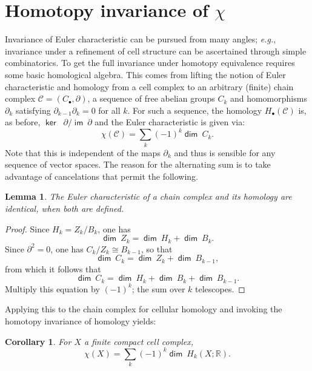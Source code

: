 \documentclass{psapm-l}
\newtheorem{lemma}[theorem]{Lemma}
\newtheorem{corollary}[theorem]{Corollary}
\theoremstyle{definition}
\theoremstyle{remark}
\numberwithin{equation}{section}
\begin{document}
\section{Homotopy invariance of $\chi$}
\label{sec:homot}

Invariance of Euler characteristic can be pursued from many angles; {{\em e.g.}}, invariance under a refinement of cell structure can be ascertained through simple combinatorics. To get the full invariance under homotopy equivalence requires some basic homological algebra. This comes from lifting the notion of Euler characteristic and homology from a cell complex to an arbitrary (finite) chain complex ${{\mathcal C}}=(C_{\bullet},{\partial})$, a sequence of free abelian groups $C_k$ and homomorphisms ${\partial}_k$ satisfying ${\partial}_{k-1}{\partial}_k=0$ for all $k$. For such a sequence, the homology $H_{\bullet}({{\mathcal C}})$ is, as before, ${{{\operatorname{\mathsf{{ker\ }}}}}}\ {\partial} / {{{\operatorname{\mathsf{{im}}}}}}\ {\partial}$ and the Euler characteristic is given via:
\begin{equation}
\label{eq:ChainEuler}
    \chi({{\mathcal C}}) = \sum_{k}(-1)^k {{{\operatorname{\mathsf{{dim}}}}}}\ C_k .
\end{equation}
Note that this is independent of the maps ${\partial}_k$ and thus is sensible for any sequence of vector spaces. The reason for the alternating sum is to take advantage of cancelations that permit the following.

\begin{lemma}
\label{lem:ChainEuler}
The Euler characteristic of a chain complex and its homology are identical, when both are defined.
\end{lemma}
\begin{proof}
Since $H_k=Z_k/B_k$, one has
\[
    {{{\operatorname{\mathsf{{dim}}}}}}\ Z_k = {{{\operatorname{\mathsf{{dim}}}}}}\ H_k + {{{\operatorname{\mathsf{{dim}}}}}}\ B_k .
\]
Since ${\partial}^2=0$, one has $C_k/Z_k\cong B_{k-1}$, so that
\[
    {{{\operatorname{\mathsf{{dim}}}}}}\ C_k = {{{\operatorname{\mathsf{{dim}}}}}}\ Z_k + {{{\operatorname{\mathsf{{dim}}}}}}\ B_{k-1} ,
\]
from which it follows that
\[
    {{{\operatorname{\mathsf{{dim}}}}}}\ C_k = {{{\operatorname{\mathsf{{dim}}}}}}\ H_k + {{{\operatorname{\mathsf{{dim}}}}}}\ B_k + {{{\operatorname{\mathsf{{dim}}}}}}\ B_{k-1}.
\]
Multiply this equation by $(-1)^k$; the sum over $k$ telescopes.
\end{proof}

Applying this to the chain complex for cellular homology and invoking the homotopy invariance of homology yields:
\begin{corollary}
\label{cor:EulerChar}
For $X$ a finite compact cell complex,
\begin{equation}
\label{eq:homeuler}
    \chi(X) = \sum_k(-1)^k{{{\operatorname{\mathsf{{dim}}}}}}\ H_k(X;{{\mathbb R}}).
\end{equation}
\end{corollary}
\end{document}
